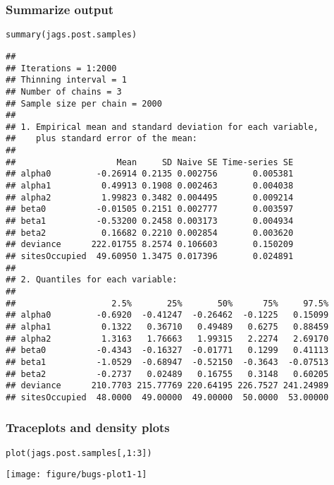 \documentclass[color=usenames,dvipsnames]{beamer}\usepackage[]{graphicx}\usepackage[]{color}
\makeatletter
\newcommand{\hlnum}[1]{\textcolor[rgb]{0.69,0.494,0}{#1}}%
\newcommand{\hlopt}[1]{\textcolor[rgb]{0,0,0}{#1}}%
\newcommand{\hlstd}[1]{\textcolor[rgb]{0,0,0}{#1}}%
\newcommand{\hlkwd}[1]{\textcolor[rgb]{0.004,0.004,0.506}{#1}}%
\newenvironment{kframe}{%
 \def\at@end@of@kframe{}%
 \ifinner\ifhmode%
  \def\at@end@of@kframe{\end{minipage}}%
  \begin{minipage}{\columnwidth}%
 \fi\fi%
 \def\FrameCommand##1{\hskip\@totalleftmargin \hskip-\fboxsep
 \colorbox{shadecolor}{##1}\hskip-\fboxsep
     \hskip-\linewidth \hskip-\@totalleftmargin \hskip\columnwidth}%
 \MakeFramed {\advance\hsize-\width
   \@totalleftmargin\z@ \linewidth\hsize
   \@setminipage}}%
 {\par\unskip\endMakeFramed%
 \at@end@of@kframe}
\newenvironment{knitrout}{}{} %
\makeatother
\begin{document}
\begin{frame}[fragile]
  \frametitle{Summarize output}
\begin{knitrout}\tiny
{}\color{fgcolor}\begin{kframe}
\begin{alltt}
\hlkwd{summary}\hlstd{(jags.post.samples)}
\end{alltt}
\begin{verbatim}
## 
## Iterations = 1:2000
## Thinning interval = 1 
## Number of chains = 3 
## Sample size per chain = 2000 
## 
## 1. Empirical mean and standard deviation for each variable,
##    plus standard error of the mean:
## 
##                    Mean     SD Naive SE Time-series SE
## alpha0         -0.26914 0.2135 0.002756       0.005381
## alpha1          0.49913 0.1908 0.002463       0.004038
## alpha2          1.99823 0.3482 0.004495       0.009214
## beta0          -0.01505 0.2151 0.002777       0.003597
## beta1          -0.53200 0.2458 0.003173       0.004934
## beta2           0.16682 0.2210 0.002854       0.003620
## deviance      222.01755 8.2574 0.106603       0.150209
## sitesOccupied  49.60950 1.3475 0.017396       0.024891
## 
## 2. Quantiles for each variable:
## 
##                   2.5%       25%       50%      75%     97.5%
## alpha0         -0.6920  -0.41247  -0.26462  -0.1225   0.15099
## alpha1          0.1322   0.36710   0.49489   0.6275   0.88459
## alpha2          1.3163   1.76663   1.99315   2.2274   2.69170
## beta0          -0.4343  -0.16327  -0.01771   0.1299   0.41113
## beta1          -1.0529  -0.68947  -0.52150  -0.3643  -0.07513
## beta2          -0.2737   0.02489   0.16755   0.3148   0.60205
## deviance      210.7703 215.77769 220.64195 226.7527 241.24989
## sitesOccupied  48.0000  49.00000  49.00000  50.0000  53.00000
\end{verbatim}
\end{kframe}
\end{knitrout}
\end{frame}




\begin{frame}[fragile]
  \frametitle{Traceplots and density plots}
\begin{knitrout}\footnotesize
{}\color{fgcolor}\begin{kframe}
\begin{alltt}
\hlkwd{plot}\hlstd{(jags.post.samples[,}\hlnum{1}\hlopt{:}\hlnum{3}\hlstd{])}
\end{alltt}
\end{kframe}

{\centering \texttt{[image: figure/bugs-plot1-1]} 

}


\end{knitrout}
\end{frame}
\end{document}
